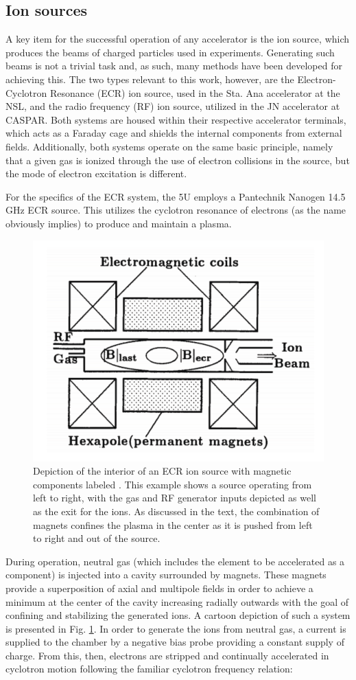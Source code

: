 \subsection{Ion sources}
\label{sec: ion sources}

A key item for the successful operation of any accelerator is the ion source, which produces the beams of charged particles used in experiments. Generating such beams is not a trivial task and, as such, many methods have been developed for achieving this. The two types relevant to this work, however, are the Electron-Cyclotron Resonance (ECR) ion source, used in the Sta. Ana accelerator at the NSL, and the radio frequency (RF) ion source, utilized in the JN accelerator at CASPAR.  Both systems are housed within their respective accelerator terminals, which acts as a Faraday cage and shields the internal components from external fields. Additionally, both systems operate on the same basic principle, namely that a given gas is ionized through the use of electron collisions in the source, but the mode of electron excitation is different. 

For the specifics of the ECR system, the 5U employs a Pantechnik Nanogen 14.5 GHz ECR source. This utilizes the cyclotron resonance of electrons (as the name obviously implies) to produce and maintain a plasma.


\begin{figure}
\centering
\includegraphics[width=0.5\linewidth]{figures/ecrSchematic.png}
\caption{Depiction of the interior of an ECR ion source with magnetic components labeled \cite{Melin1997}. This example shows a source operating from left to right, with the gas and RF generator inputs depicted as well as the exit for the ions. As discussed in the text, the combination of magnets confines the plasma in the center as it is pushed from left to right and out of the source.}
\label{fig: ecris}
\end{figure}


During operation, neutral gas (which includes the element to be accelerated as a component) is injected into a cavity surrounded by magnets. These magnets provide a superposition of axial and multipole fields in order to achieve a minimum at the center of the cavity increasing radially outwards with the goal of confining and stabilizing the generated ions. A cartoon depiction of such a system is presented in Fig. \ref{fig: ecris}. In order to generate the ions from neutral gas, a current is supplied to the chamber by a negative bias probe providing a constant supply of charge. From this, then, electrons are stripped and continually accelerated in cyclotron motion following the familiar cyclotron frequency relation:

